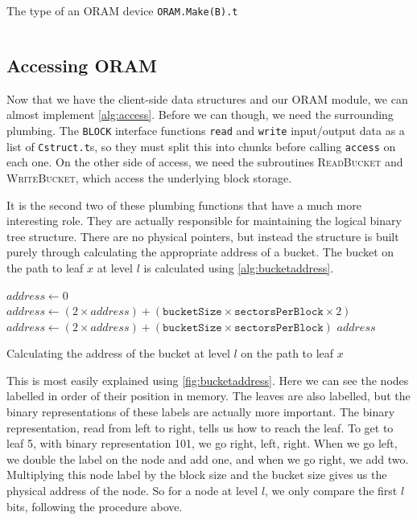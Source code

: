 \documentclass[12pt,a4paper,twoside,openright]{report}
\begin{document}
\begin{listing}[t]
\caption{The type of an ORAM device \texttt{ORAM.Make(B).t}}
\label{lst:orammaketype}
\inputminted[fontsize=\scriptsize,firstline=87, lastline=118]{ocaml}{../mirage-oram/lib/oram.ml}
\end{listing}



\subsection{Accessing ORAM}

Now that we have the client-side data structures and our ORAM module, we can almost implement \cref{alg:access}. Before we can though, we need the surrounding plumbing. The \texttt{BLOCK} interface functions \texttt{read} and \texttt{write} input/output data as a list of \texttt{Cstruct.t}s, so they must split this into chunks before calling \texttt{access} on each one. On the other side of access, we need the subroutines \textsc{ReadBucket} and \textsc{WriteBucket}, which access the underlying block storage.

It is the second two of these plumbing functions that have a much more interesting role. They are actually responsible for maintaining the logical binary tree structure. There are no physical pointers, but instead the structure is built purely through calculating the appropriate address of a bucket. The bucket on the path to leaf $x$ at level $l$ is calculated using \cref{alg:bucketaddress}.

\begin{algorithm}[t]
  \footnotesize
  \begin{algorithmic}
  \vskip 10pt
      \State $address \gets 0$
          \State $address \gets (2 \times address) + (\mathtt{bucketSize} \times \mathtt{sectorsPerBlock} \times 2)$
        \Else
          \State $address \gets (2 \times address) + (\mathtt{bucketSize} \times \mathtt{sectorsPerBlock})$
        \EndIf
      \EndFor
      \State \Return $address$
    \EndFunction
  \vskip 10pt
  \end{algorithmic}
  \caption{Calculating the address of the bucket at level $l$ on the path to leaf $x$}
  \label{alg:bucketaddress}
\end{algorithm}

This is most easily explained using \cref{fig:bucketaddress}. Here we can see the nodes labelled in order of their position in memory. The leaves are also labelled, but the binary representations of these labels are actually more important. The binary representation, read from left to right, tells us how to reach the leaf. To get to leaf 5, with binary representation 101, we go right, left, right. When we go left, we double the label on the node and add one, and when we go right, we add two. Multiplying this node label by the block size and the bucket size gives us the physical address of the node. So for a node at level $l$, we only compare the first $l$ bits, following the procedure above.
\end{document}
